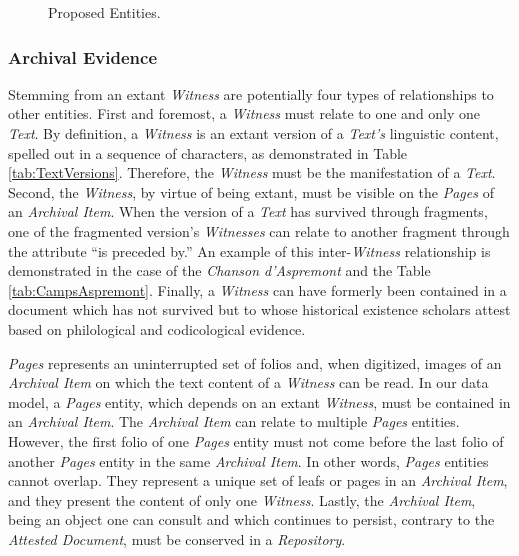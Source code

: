 \begin{figure}[ht]
    \begin{center}
        
    \end{center}
\caption{Proposed Entities.}
\label{fig:ProposedEntities}
\end{figure}

\subsubsection{Archival Evidence}

Stemming from an extant \textit{Witness} are potentially four types of relationships to other entities. First and foremost, a \textit{Witness} must relate to one and only one \textit{Text}. By definition, a \textit{Witness} is an extant version of a \textit{Text's} linguistic content, spelled out in a sequence of characters, as demonstrated in Table \ref{tab:TextVersions}. Therefore, the \textit{Witness} must be the manifestation of a \textit{Text}. Second, the \textit{Witness}, by virtue of being extant, must be visible on the \textit{Pages} of an \textit{Archival Item}. When the version of a \textit{Text} has survived through fragments, one of the fragmented version's \textit{Witnesses} can relate to another fragment through the attribute ``is preceded by.'' An example of this inter-\textit{Witness} relationship is demonstrated in the case of the \textit{Chanson d'Aspremont} and the Table \ref{tab:CampsAspremont}. Finally, a \textit{Witness} can have formerly been contained in a document which has not survived but to whose historical existence scholars attest based on philological and codicological evidence.

\textit{Pages} represents an uninterrupted set of folios and, when digitized, images of an \textit{Archival Item} on which the text content of a \textit{Witness} can be read. In our data model, a \textit{Pages} entity, which depends on an extant \textit{Witness}, must be contained in an \textit{Archival Item}. The \textit{Archival Item} can relate to multiple \textit{Pages} entities. However, the first folio of one \textit{Pages} entity must not come before the last folio of another \textit{Pages} entity in the same \textit{Archival Item}. In other words, \textit{Pages} entities cannot overlap. They represent a unique set of leafs or pages in an \textit{Archival Item}, and they present the content of only one \textit{Witness}. Lastly, the \textit{Archival Item}, being an object one can consult and which continues to persist, contrary to the \textit{Attested Document}, must be conserved in a \textit{Repository}.

